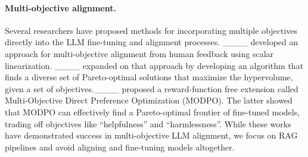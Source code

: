 \paragraph{Multi-objective alignment.} Several researchers have proposed methods for incorporating multiple objectives directly into the LLM fine-tuning and alignment processes. ____ developed an approach for multi-objective alignment from human feedback using scalar linearization. ____ expanded on that approach by developing an algorithm that finds a diverse set of Pareto-optimal solutions that maximize the hypervolume, given a set of objectives.____ proposed a reward-function free extension called Multi-Objective Direct Preference Optimization (MODPO). The latter showed that MODPO can effectively find a Pareto-optimal frontier of fine-tuned models, trading off objectives like ``helpfulness'' and ``harmlessness''. While these works have demonstrated success in multi-objective LLM alignment, we focus on RAG pipelines and avoid aligning and fine-tuning models altogether. 
